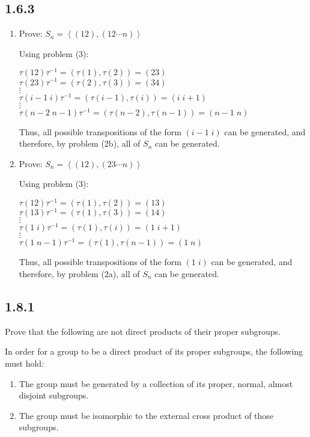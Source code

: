 \documentclass[letterpaper,12pt,fleqn]{article}
\renewcommand{\t}{\tau}
\newcommand{\cycle}[1]{\left<#1\right>}
\begin{document}
\subsection*{1.6.3}
\begin{enumerate}[label={\alph*)}]
\item Prove: $S_n=\cycle{(12),(12\cdots n)}$

  Using problem (3):

  $\t(12)\t^{-1}=(\t(1),\t(2))=(23)$ \\
  $\t(23)\t^{-1}=(\t(2),\t(3))=(34)$ \\
  $\vdots$ \\
  $\t(i-1\;i)\t^{-1}=(\t(i-1),\t(i))=(i\;i+1)$ \\
  $\vdots$ \\
  $\t(n-2\;n-1)\t^{-1}=(\t(n-2),\t(n-1))=(n-1\;n)$

  Thus, all possible transpositions of the form $(i-1\;i)$ can be generated,
  and therefore, by problem (2b), all of $S_n$ can be generated.

\item Prove: $S_n=\cycle{(12),(23\cdots n)}$

  Using problem (3):

  $\t(12)\t^{-1}=(\t(1),\t(2))=(13)$ \\
  $\t(13)\t^{-1}=(\t(1),\t(3))=(14)$ \\
  $\vdots$ \\
  $\t(1\;i)\t^{-1}=(\t(1),\t(i))=(1\;i+1)$ \\
  $\vdots$ \\
  $\t(1\;n-1)\t^{-1}=(\t(1),\t(n-1))=(1\;n)$

  Thus, all possible transpositions of the form $(1\;i)$ can be generated,
  and therefore, by problem (2a), all of $S_n$ can be generated.
\end{enumerate}

\subsection*{1.8.1}

Prove that the following are not direct products of their proper subgroups.

In order for a group to be a direct product of its proper subgroups, the
following must hold:
\begin{enumerate}
\item The group must be generated by a collection of its proper, normal,
  almost disjoint subgroups.
\item The group must be isomorphic to the external cross product of those
  subgroups.
\end{enumerate}
\end{document}
